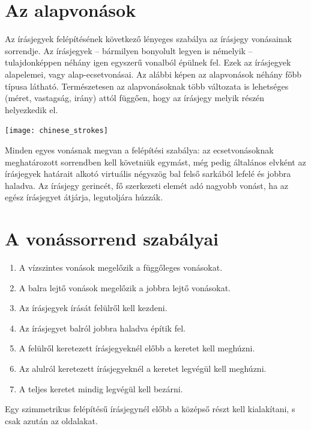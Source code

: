 
\section{Az alapvonások}

Az írásjegyek felépítésének következő lényeges szabálya az írásjegy vonásainak sorrendje. Az írásjegyek – bármilyen bonyolult legyen is némelyik – tulajdonképpen néhány igen egyszerű vonalból épülnek fel. Ezek az írásjegyek alapelemei, vagy alap-ecsetvonásai. Az alábbi képen az alapvonások néhány főbb típusa látható. Természetesen az alapvonásoknak több változata is lehetséges (méret, vastagság, irány) attól függően, hogy az írásjegy melyik részén helyezkedik el.

\begin{center}
	\texttt{[image: chinese\_strokes]}
\end{center}

Minden egyes vonásnak megvan a felépítési szabálya: az ecsetvonásoknak meghatározott sorrendben kell követniük egymást, még pedig általános elvként az írásjegyek határait alkotó virtuális négyszög bal felső sarkából lefelé és jobbra haladva. Az írásjegy gerincét, fő szerkezeti elemét adó nagyobb vonást, ha az egész írásjegyet átjárja, legutoljára húzzák.

\section{A vonássorrend szabályai}

\begin{enumerate}
	\item A vízszintes vonások megelőzik a függőleges vonásokat.
	\item A balra lejtő vonások megelőzik a jobbra lejtő vonásokat. 
	\item Az írásjegyek írását felülről kell kezdeni. 
	\item Az írásjegyet balról jobbra haladva építik fel. 
	\item A felülről keretezett írásjegyeknél előbb a keretet kell meghúzni. 
	\item Az alulról keretezett írásjegyeknél a keretet legvégül kell meghúzni. 
	\item A teljes keretet mindig legvégül kell bezárni.
\end{enumerate}

Egy szimmetrikus felépítésű írásjegynél előbb a középső részt kell kialakítani, s csak azután az oldalakat.

